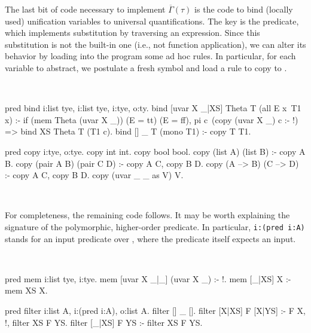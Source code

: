 \documentclass[a4paper, 11pt]{book}
\newenvironment{elpicode}
  {\VerbatimEnvironment~\\\begin{elpibox}\begin{xelpicode}}{\end{xelpicode}
\end{elpibox}\\}
\begin{document}
\noindent
The last bit of code necessary to implement $\overline{\Gamma}(\tau)$ is the
code to bind (locally used) unification variables to universal
quantifications. The key is the  predicate, which implements
substitution by traversing an expression. Since this substitution is not
the built-in one (i.e., not function application), we can alter its behavior
by loading into the program some ad hoc rules. In particular, for
each variable  to abstract, we postulate a fresh symbol
 and load a rule to copy  to .

\begin{elpicode}
pred bind i:list tye, i:list tye, i:tye, o:ty.
bind [uvar X _|XS] Theta T (all E x\ T1 x) :- %
  if (mem Theta (uvar X _)) (E = tt) (E = ff),
  pi c\ (copy (uvar X _) c :- !) => bind XS Theta T (T1 c).
bind [] _ T (mono T1) :- copy T T1. %

pred copy i:tye, o:tye.
copy int int.
copy bool bool.
copy (list A) (list B) :- copy A B.
copy (pair A B) (pair C D) :- copy A C, copy B D.
copy (A --> B) (C --> D) :- copy A C, copy B D.
copy (uvar _ _ as V) V.
\end{elpicode}

\noindent
For completeness, the remaining code follows. It may be worth explaining the
signature of the polymorphic, higher-order  predicate. In
particular, \texttt{i:(pred i:A)} stands for an input predicate over
, where the predicate itself expects an input.

\begin{elpicode}
pred mem i:list tye, i:tye.
mem [uvar X _|_] (uvar X _) :- !.
mem [_|XS] X :- mem XS X.
 
pred filter i:list A, i:(pred i:A), o:list A.
filter [] _ [].
filter [X|XS] F [X|YS] :- F X, !, filter XS F YS.
filter [_|XS] F YS :- filter XS F YS.
\end{elpicode}
\end{document}
